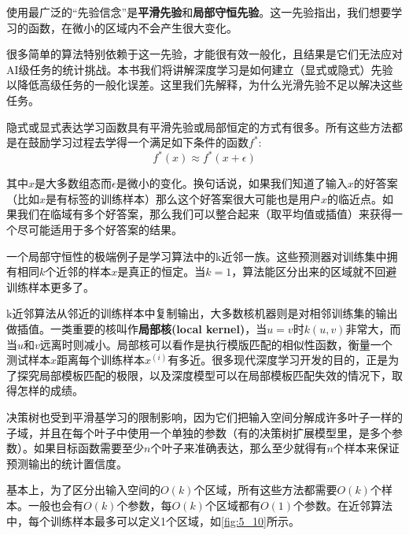 使用最广泛的“先验信念”是\textbf{平滑先验}和\textbf{局部守恒先验}。这一先验指出，我们想要学习的函数，在微小的区域内不会产生很大变化。

很多简单的算法特别依赖于这一先验，才能很有效一般化，且结果是它们无法应对AI级任务的统计挑战。本书我们将讲解深度学习是如何建立（显式或隐式）先验以降低高级任务的一般化误差。这里我们先解释，为什么光滑先验不足以解决这些任务。

隐式或显式表达学习函数具有平滑先验或局部恒定的方式有很多。所有这些方法都是在鼓励学习过程去学得一个满足如下条件的函数$f^*$:
\begin{equation}
	f^*(x) \approx f^*(x + \epsilon)
	\label{form:5.95}
\end{equation}

其中$x$是大多数组态而$\epsilon$是微小的变化。换句话说，如果我们知道了输入$x$的好答案（比如$x$是有标签的训练样本）那么这个好答案很大可能也是用户$x$的临近点。如果我们在临域有多个好答案，那么我们可以整合起来（取平均值或插值）来获得一个尽可能适用于多个好答案的结果。

一个局部守恒性的极端例子是学习算法中的k近邻一族。这些预测器对训练集中拥有相同$k$个近邻的样本$x$是真正的恒定。当$k=1$，算法能区分出来的区域就不回避训练样本更多了。

k近邻算法从邻近的训练样本中复制输出，大多数核机器则是对相邻训练集的输出做插值。一类重要的核叫作\textbf{局部核(local kernel)}，当$u=v$时$k(u,v)$非常大，而当$u$和$v$远离时则减小。局部核可以看作是执行模版匹配的相似性函数，衡量一个测试样本$x$距离每个训练样本$x^(i)$有多近。很多现代深度学习开发的目的，正是为了探究局部模板匹配的极限，以及深度模型可以在局部模板匹配失效的情况下，取得怎样的成绩。

决策树也受到平滑基学习的限制影响，因为它们把输入空间分解成许多叶子一样的子域，并且在每个叶子中使用一个单独的参数（有的决策树扩展模型里，是多个参数）。如果目标函数需要至少$n$个叶子来准确表达，那么至少就得有$n$个样本来保证预测输出的统计置信度。

基本上，为了区分出输入空间的$O(k)$个区域，所有这些方法都需要$O(k)$个样本。一般也会有$O(k)$个参数，每$O(k)$个区域都有$O(1)$个参数。在近邻算法中，每个训练样本最多可以定义1个区域，如\ref{fig:5_10}所示。


